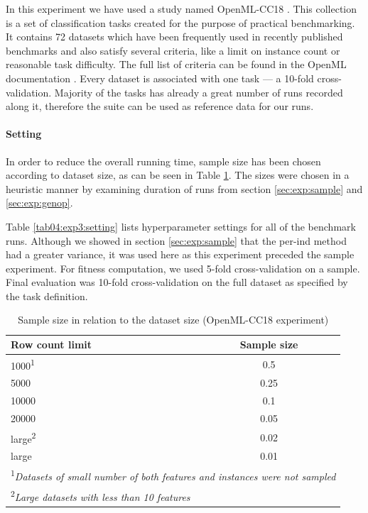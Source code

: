 In this experiment we have used a study named OpenML-CC18 \citep{openmlcc18}.
This collection is a set of classification tasks created for the purpose
of practical benchmarking. It contains 72 datasets which have been frequently
used in recently published benchmarks and also satisfy several criteria, like
a limit on instance count or reasonable task difficulty. The full list of
criteria can be found in the OpenML documentation \citep{openmlcc18docs}.
Every dataset is associated with one task --- a 10-fold cross-validation. 
Majority of the tasks has already a great number of runs recorded along it,
therefore the suite can be used as reference data for our runs.

\paragraph{Setting}
In order to reduce the overall running time, sample size has been chosen
according to dataset size, as can be seen in Table \ref{tab04:exp3:size}.
The sizes were chosen in a heuristic manner by examining duration of runs
from section \ref{sec:exp:sample} and \ref{sec:exp:genop}.

Table \ref{tab04:exp3:setting} lists hyperparameter settings for all of the
benchmark runs. Although we showed in section \ref{sec:exp:sample}
that the per-ind method had a greater variance, it was used here as this
experiment preceded the sample experiment. For fitness computation, we used
5-fold cross-validation on a sample. Final evaluation was 10-fold
cross-validation on the full dataset as specified by the task definition.

\begin{table}[ht]

\centering
\caption{Sample size in relation to the dataset size (OpenML-CC18 experiment)}\label{tab04:exp3:size}
\begin{tabular}{l c}
\toprule
\textbf{Row count limit} & \textbf{Sample size} \\
\midrule
1000\textsuperscript{1} & 0.5 \\
5000 & 0.25 \\
10000 & 0.1 \\
20000 & 0.05 \\
large\textsuperscript{2} & 0.02 \\
large & 0.01 \\
\bottomrule

\multicolumn{2}{l}{\footnotesize
\textsuperscript{1}\textit{Datasets of small number of both features and
instances were not sampled}} \\
\multicolumn{2}{l}{\footnotesize
\textsuperscript{2}\textit{Large datasets with less than 10 features}} 

\end{tabular}

\end{table}

